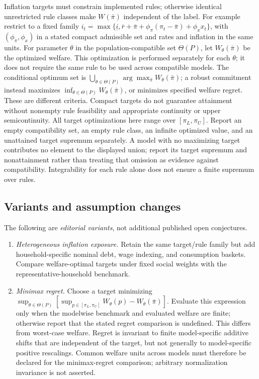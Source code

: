 \documentclass[11pt,a4paper]{article}
\begin{document}
Inflation targets must constrain implemented rules; otherwise identical unrestricted rule classes make \(W(\bar\pi)\) independent of the label. For example restrict to a fixed family \(i_t=\max\{\underline i,\bar r+\bar\pi+\phi_\pi(\pi_t-\bar\pi)+\phi_xx_t\}\), with \((\phi_\pi,\phi_x)\) in a stated compact admissible set and rates and inflation in the same units. For parameter \(\theta\) in the population-compatible set \(\Theta(P)\), let \(W_\theta(\bar\pi)\) be the optimized welfare. This optimization is performed separately for each \(\theta\); it does not require the same rule to be used across compatible models. The conditional optimum set is \(\bigcup_{\theta\in\Theta(P)}\arg\max_{\bar\pi}W_\theta(\bar\pi)\); a robust commitment instead maximizes \(\inf_{\theta\in\Theta(P)}W_\theta(\bar\pi)\), or minimizes specified welfare regret. These are different criteria. Compact targets do not guarantee attainment without nonempty rule feasibility and appropriate continuity or upper semicontinuity. All target optimizations here range over \([\pi_L,\pi_U]\). Report an empty compatibility set, an empty rule class, an infinite optimized value, and an unattained target supremum separately. A model with no maximizing target contributes no element to the displayed union; report its target supremum and nonattainment rather than treating that omission as evidence against compatibility. Integrability for each rule alone does not ensure a finite supremum over rules.
\subsection*{Variants and assumption changes}
The following are \emph{editorial variants}, not additional published open conjectures.
\begin{enumerate}
\item \emph{Heterogeneous inflation exposure.} Retain the same target/rule family but add household-specific nominal debt, wage indexing, and consumption baskets. Compare welfare-optimal targets under fixed social weights with the representative-household benchmark.
\item \emph{Minimax regret.} Choose a target minimizing \(\sup_{\theta\in\Theta(P)}[\sup_{p\in[\pi_L,\pi_U]}W_\theta(p)-W_\theta(\bar\pi)]\). Evaluate this expression only when the modelwise benchmark and evaluated welfare are finite; otherwise report that the stated regret comparison is undefined. This differs from worst-case welfare. Regret is invariant to finite model-specific additive shifts that are independent of the target, but not generally to model-specific positive rescalings. Common welfare units across models must therefore be declared for the minimax-regret comparison; arbitrary normalization invariance is not asserted.
\end{enumerate}
\end{document}
